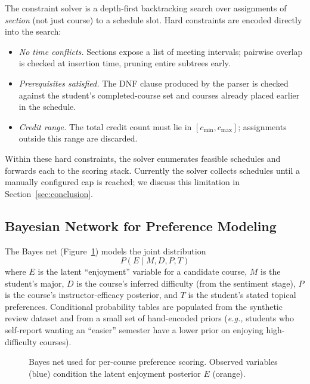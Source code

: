 \documentclass[10pt,letterpaper]{article}
\newcommand{\eg}{\emph{e.g.,}}
\begin{document}
The constraint solver is a depth-first backtracking search over assignments
of \emph{section} (not just course) to a schedule slot. Hard constraints
are encoded directly into the search:
\begin{itemize}[leftmargin=*,topsep=1pt,itemsep=1pt]
  \item \emph{No time conflicts.} Sections expose a list of meeting
    intervals; pairwise overlap is checked at insertion time, pruning entire
    subtrees early.
  \item \emph{Prerequisites satisfied.} The DNF clause produced by the
    parser is checked against the student's completed-course set and
    courses already placed earlier in the schedule.
  \item \emph{Credit range.} The total credit count must lie in
    $[c_{\min}, c_{\max}]$; assignments outside this range are
    discarded.
\end{itemize}
Within these hard constraints, the solver enumerates feasible schedules and
forwards each to the scoring stack. Currently the solver collects
schedules until a manually configured cap is reached; we discuss this
limitation in Section~\ref{sec:conclusion}.

\subsection{Bayesian Network for Preference Modeling}

The Bayes net (Figure~\ref{fig:bayesnet}) models the joint distribution
\[
  P(E \mid M, D, P, T)
\]
where $E$ is the latent ``enjoyment'' variable for a candidate course,
$M$ is the student's major, $D$ is the course's inferred difficulty (from
the sentiment stage), $P$ is the course's instructor-efficacy posterior,
and $T$ is the student's stated topical preferences. Conditional probability
tables are populated from the synthetic review dataset and from a small
set of hand-encoded priors (\eg{} students who self-report wanting an
``easier'' semester have a lower prior on enjoying high-difficulty
courses).

\begin{figure}[t]
  \centering
  \caption{Bayes net used for per-course preference scoring. Observed
    variables (blue) condition the latent enjoyment posterior $E$ (orange).}
  \label{fig:bayesnet}
\end{figure}
\end{document}
